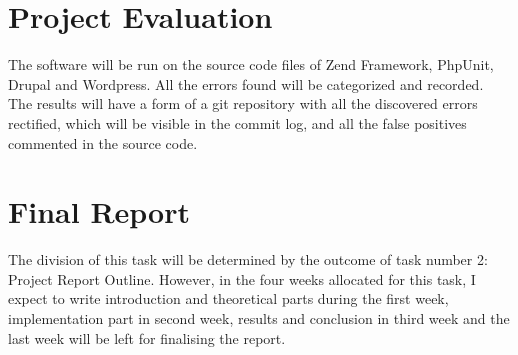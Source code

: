 \section{Project Evaluation}
The software will be run on the source code files of 
Zend Framework, PhpUnit, Drupal and Wordpress. 
All the errors found will be categorized and recorded. 
The results will have a form of a git repository with 
all the discovered errors rectified, which will be visible 
in the commit log, and all the false positives commented in 
the source code.

\section{Final Report}
The division of this task will be determined by the outcome of 
task number 2: Project Report Outline. However, in the four 
weeks allocated for this task, I expect to write 
introduction and theoretical parts during the first week, 
implementation part in second week, 
results and conclusion in third week and 
the last week will be left for finalising the report.

